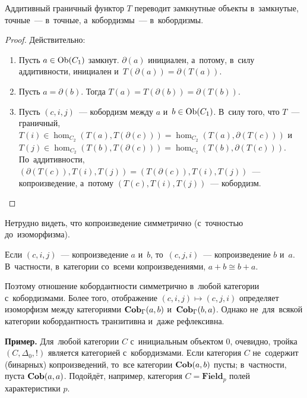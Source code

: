 \documentclass[a4paper,oneside]{article}
\begin{document}
\begin{statement*}
  Аддитивный граничный функтор $T$ переводит замкнутные объекты в~замкнутые, точные~— в~точные, а~кобордизмы~— в~кобордизмы.
\end{statement*}

\begin{proof}
  Действительно:
  \begin{enumerate}
    \item Пусть $a \in \mathrm{Ob}(C_1)$ замкнут. $\partial(a)$ инициален, а~потому, в~силу аддитивности,
    инициален и~$T(\partial(a)) = \partial(T(a))$.

    \item Пусть $a = \partial(b)$. Тогда $T(a) = T(\partial(b)) = \partial(T(b))$.

    \item Пусть $(c, i, j)$~— кобордизм между $a$ и~$b \in \mathrm{Ob}(C_1)$.
          В~силу того, что $T$~— граничный, $T(i) \in \hom_{C_2}(T(a), T(\partial(c))) = \hom_{C_2}(T(a), \partial(T(c)))$
          и~$T(j) \in \hom_{C_2}(T(b), T(\partial(c))) = \hom_{C_2}(T(b), \partial(T(c)))$.
          По~аддитивности, $(\partial(T(c)),\allowbreak T(i),\allowbreak T(j)) = (T(\partial(c)), T(i), T(j))$~— копроизведение,
          а~потому $(T(c),\allowbreak T(i),\allowbreak T(j))$~— кобордизм. \qedhere
  \end{enumerate}
\end{proof}

Нетрудно видеть, что копроизведение симметрично (с~точностью до~изоморфизма).

\begin{statement*}
  Если $(c, i, j)$~— копроизведение $a$ и~$b$, то~$(c, j, i)$~— копроизведение $b$ и~$a$.
  В~частности, в~категории со~всеми копроизведениями, $a + b \cong b + a$.
\end{statement*}

Поэтому отношение кобордантности симметрично в~любой категории с~кобордизмами. Более того, отображение $(c, i, j) \mapsto (c, j, i)$
определяет изоморфизм между категориями $\mathbf{Cob}_\Gamma(a, b)$ и~$\mathbf{Cob}_\Gamma(b, a)$.
Однако не~для~всякой категории кобордантность транзитивна и~даже рефлексивна.

\medskip
\noindent\textbf{Пример.} Для~любой категории $C$ с~инициальным объектом $0$, очевидно, тройка $(C, \Delta_0, !)$
является категорией с~кобордизмами. Если категория $C$ не~содержит (бинарных) копроизведений,
то~все категории $\mathbf{Cob}(a, b)$ пусты; в~частности, пуста $\mathbf{Cob}(a, a)$.
Подойдёт, например, категория $C = \mathbf{Field}_p$ полей характеристики $p$.
\end{document}

